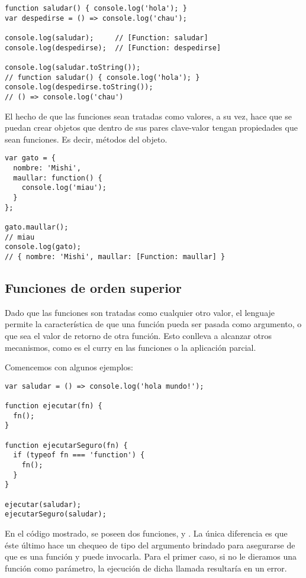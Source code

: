 \begin{lstlisting}[title={Analizando el valor de una función}]
function saludar() { console.log('hola'); }
var despedirse = () => console.log('chau');

console.log(saludar);     // [Function: saludar]
console.log(despedirse);  // [Function: despedirse]

console.log(saludar.toString());  
// function saludar() { console.log('hola'); }
console.log(despedirse.toString()); 
// () => console.log('chau')
\end{lstlisting}

El hecho de que las funciones sean tratadas como valores, a su vez, hace que se puedan crear objetos que dentro de sus pares clave-valor tengan propiedades que sean funciones. Es decir, métodos del objeto.

\begin{lstlisting}[title={Asignando una función como valor de una propiedad a un objeto}]
var gato = {
  nombre: 'Mishi',
  maullar: function() {
    console.log('miau');
  }
};

gato.maullar();   
// miau
console.log(gato);  
// { nombre: 'Mishi', maullar: [Function: maullar] }
\end{lstlisting}

\subsection{Funciones de orden superior}

Dado que las funciones son tratadas como cualquier otro valor, el lenguaje permite la característica de que una función pueda ser pasada como argumento, o que sea el valor de retorno de otra función. Esto conlleva a alcanzar otros mecanismos, como es el curry en las funciones o la aplicación parcial.

Comencemos con algunos ejemplos:

\begin{lstlisting}[title={Pasando una función como argumento}]
var saludar = () => console.log('hola mundo!');

function ejecutar(fn) {
  fn();
}

function ejecutarSeguro(fn) {
  if (typeof fn === 'function') {
    fn();
  }
}

ejecutar(saludar);
ejecutarSeguro(saludar);
\end{lstlisting}

En el código mostrado, se poseen dos funciones,  y . La única diferencia es que éste último hace un chequeo de tipo del argumento brindado para asegurarse de que es una función y puede invocarla. Para el primer caso, si no le dieramos una función como parámetro, la ejecución de dicha llamada resultaría en un error.

